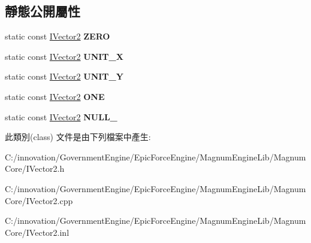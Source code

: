 \subsection*{靜態公開屬性}
\begin{DoxyCompactItemize}
\item 
static const \hyperlink{class_i_dream_sky_1_1_i_vector2}{I\+Vector2} {\bfseries Z\+E\+RO}\hypertarget{class_i_dream_sky_1_1_i_vector2_ab12d1abacafeb0e4cbc159cb642d4e90}{}\label{class_i_dream_sky_1_1_i_vector2_ab12d1abacafeb0e4cbc159cb642d4e90}

\item 
static const \hyperlink{class_i_dream_sky_1_1_i_vector2}{I\+Vector2} {\bfseries U\+N\+I\+T\+\_\+X}\hypertarget{class_i_dream_sky_1_1_i_vector2_abb5f5aee9e5ed873eb28dc03561ce55a}{}\label{class_i_dream_sky_1_1_i_vector2_abb5f5aee9e5ed873eb28dc03561ce55a}

\item 
static const \hyperlink{class_i_dream_sky_1_1_i_vector2}{I\+Vector2} {\bfseries U\+N\+I\+T\+\_\+Y}\hypertarget{class_i_dream_sky_1_1_i_vector2_ab68fdf09e1409c07aac247d89a0a155c}{}\label{class_i_dream_sky_1_1_i_vector2_ab68fdf09e1409c07aac247d89a0a155c}

\item 
static const \hyperlink{class_i_dream_sky_1_1_i_vector2}{I\+Vector2} {\bfseries O\+NE}\hypertarget{class_i_dream_sky_1_1_i_vector2_a15dbda17de21c6bb3c73ef16bcee97e4}{}\label{class_i_dream_sky_1_1_i_vector2_a15dbda17de21c6bb3c73ef16bcee97e4}

\item 
static const \hyperlink{class_i_dream_sky_1_1_i_vector2}{I\+Vector2} {\bfseries N\+U\+L\+L\+\_\+}\hypertarget{class_i_dream_sky_1_1_i_vector2_a565fac7d37c78b8fe135b4fe39197c19}{}\label{class_i_dream_sky_1_1_i_vector2_a565fac7d37c78b8fe135b4fe39197c19}

\end{DoxyCompactItemize}


此類別(class) 文件是由下列檔案中產生\+:\begin{DoxyCompactItemize}
\item 
C\+:/innovation/\+Government\+Engine/\+Epic\+Force\+Engine/\+Magnum\+Engine\+Lib/\+Magnum\+Core/I\+Vector2.\+h\item 
C\+:/innovation/\+Government\+Engine/\+Epic\+Force\+Engine/\+Magnum\+Engine\+Lib/\+Magnum\+Core/I\+Vector2.\+cpp\item 
C\+:/innovation/\+Government\+Engine/\+Epic\+Force\+Engine/\+Magnum\+Engine\+Lib/\+Magnum\+Core/I\+Vector2.\+inl\end{DoxyCompactItemize}
